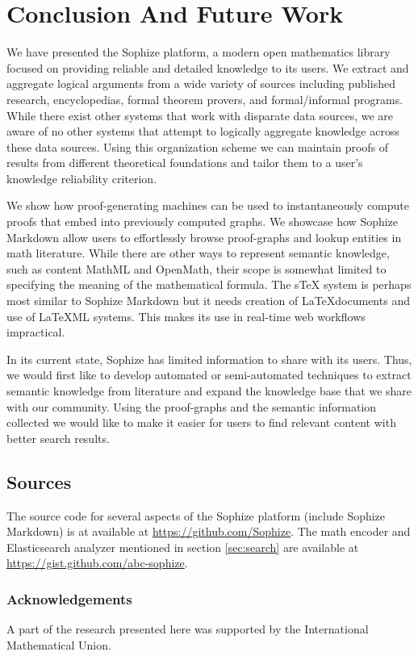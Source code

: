\documentclass[runningheads]{llncs}
\begin{document}
\section{Conclusion And Future Work}
\label{sec:conclusion}

We have presented the Sophize platform, a modern open mathematics library focused on providing reliable and detailed knowledge to its users. We extract and aggregate logical arguments from a wide variety of sources including published research, encyclopedias, formal theorem provers, and formal/informal programs. While there exist other systems that work with disparate data sources, we are aware of no other systems that attempt to logically aggregate knowledge across these data sources. Using this organization scheme we can maintain proofs of results from different theoretical foundations and tailor them to a user's knowledge reliability criterion.

We show how proof-generating machines can be used to instantaneously compute proofs that embed into previously computed graphs. We showcase how Sophize Markdown allow users to effortlessly browse proof-graphs and lookup entities in math literature. While there are other ways to represent semantic knowledge, such as content MathML and OpenMath, their scope is somewhat limited to specifying the meaning of the mathematical formula. The sTeX system \cite{Kohlhase2008} is perhaps most similar to Sophize Markdown but it needs creation of \LaTeX\space documents and use of \LaTeX ML systems. This makes its use in real-time web workflows impractical.

In its current state, Sophize has limited information to share with its users. Thus, we would first like to develop automated or semi-automated techniques to extract semantic knowledge from literature and expand the knowledge base that we share with our community. Using the proof-graphs and the semantic information collected we would like to make it easier for users to find relevant content with better search results.

\subsection*{Sources}
\label{sec:sources}
The source code for several aspects of the Sophize platform (include Sophize Markdown) is  at available at \url{https://github.com/Sophize}. The math encoder and Elasticsearch analyzer mentioned in section \ref{sec:search} are available at \url{https://gist.github.com/abc-sophize}.

\subsubsection{Acknowledgements} 
A part of the research presented here was supported by the International Mathematical Union.




\end{document}
